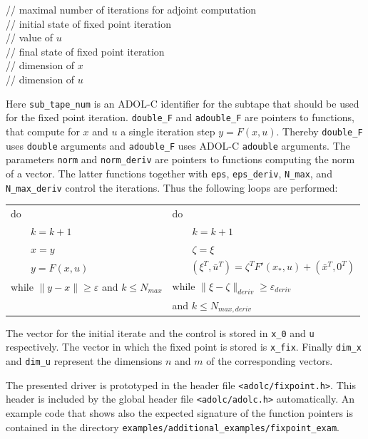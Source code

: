 \documentclass[11pt,twoside]{article}
\begin{document}
\begin{tabbing}
      \> // maximal number of iterations for adjoint computation\\
          \> // initial state of fixed point iteration\\
             \> // value of $u$\\
        \> // final state of fixed point iteration\\
             \> // dimension of $x$\\
             \> // dimension of $u$\\
\end{tabbing}
%
Here {\tt sub\_tape\_num} is an ADOL-C identifier for the subtape that
should be used for the fixed point iteration.
{\tt double\_F} and {\tt adouble\_F} are pointers to functions, that
compute for $x$ and $u$ a single iteration step $y=F(x,u)$. Thereby
{\tt double\_F} uses {\tt double} arguments and {\tt adouble\_F}
uses ADOL-C {\tt adouble} arguments. The parameters {\tt norm} and
{\tt norm\_deriv} are pointers to functions computing the norm
of a vector. The latter functions together with {\tt eps},
{\tt eps\_deriv}, {\tt N\_max}, and {\tt N\_max\_deriv} control
the iterations. Thus the following loops are performed:
\begin{center}
\begin{tabular}{ll}
  do                     &   do                           \\
  ~~~~$k = k+1$          &   ~~~~$k = k+1$                \\
  ~~~~$x = y$            &   ~~~~$\zeta = \xi$            \\
  ~~~~$y = F(x,u)$       &   ~~~
  $(\xi^T,\bar u^T) = \zeta^TF'(x_*,u) + (\bar x^T, 0^T)$ \\
  while $\|y-x\|\geq\varepsilon$ and $k\leq N_{max}$ \hspace*{0.5cm} &
  while $\|\xi -\zeta\|_{deriv}\geq\varepsilon_{deriv}$   \\
  & and $k\leq N_{max,deriv}$
\end{tabular}
\end{center}
The vector for the initial iterate and the control is stored
in {\tt x\_0} and {\tt u} respectively. The vector in which the
fixed point is stored is {\tt x\_fix}. Finally {\tt dim\_x}
and {\tt dim\_u} represent the dimensions $n$ and $m$ of the
corresponding vectors.

The presented driver is prototyped in the header file 
\verb=<adolc/fixpoint.h>=. This header
is included by the global header file \verb=<adolc/adolc.h>= automatically. 
An example code that shows also the
expected signature of the function pointers is contained in the directory \verb=examples/additional_examples/fixpoint_exam=.
%
\end{document}
